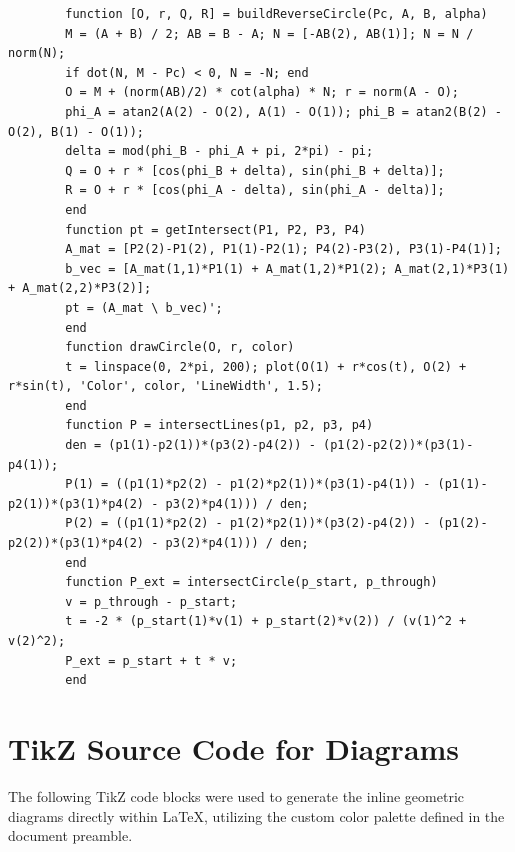 \documentclass{amsart}
\begin{document}
\begin{lstlisting}[caption={Geometric simulation and plotting script}]
		%% Local Functions
		function [O, r, Q, R] = buildReverseCircle(Pc, A, B, alpha)
		M = (A + B) / 2; AB = B - A; N = [-AB(2), AB(1)]; N = N / norm(N);
		if dot(N, M - Pc) < 0, N = -N; end
		O = M + (norm(AB)/2) * cot(alpha) * N; r = norm(A - O);
		phi_A = atan2(A(2) - O(2), A(1) - O(1)); phi_B = atan2(B(2) - O(2), B(1) - O(1));
		delta = mod(phi_B - phi_A + pi, 2*pi) - pi;
		Q = O + r * [cos(phi_B + delta), sin(phi_B + delta)];
		R = O + r * [cos(phi_A - delta), sin(phi_A - delta)];
		end
		function pt = getIntersect(P1, P2, P3, P4)
		A_mat = [P2(2)-P1(2), P1(1)-P2(1); P4(2)-P3(2), P3(1)-P4(1)];
		b_vec = [A_mat(1,1)*P1(1) + A_mat(1,2)*P1(2); A_mat(2,1)*P3(1) + A_mat(2,2)*P3(2)];
		pt = (A_mat \ b_vec)';
		end
		function drawCircle(O, r, color)
		t = linspace(0, 2*pi, 200); plot(O(1) + r*cos(t), O(2) + r*sin(t), 'Color', color, 'LineWidth', 1.5);
		end
		function P = intersectLines(p1, p2, p3, p4)
		den = (p1(1)-p2(1))*(p3(2)-p4(2)) - (p1(2)-p2(2))*(p3(1)-p4(1));
		P(1) = ((p1(1)*p2(2) - p1(2)*p2(1))*(p3(1)-p4(1)) - (p1(1)-p2(1))*(p3(1)*p4(2) - p3(2)*p4(1))) / den;
		P(2) = ((p1(1)*p2(2) - p1(2)*p2(1))*(p3(2)-p4(2)) - (p1(2)-p2(2))*(p3(1)*p4(2) - p3(2)*p4(1))) / den;
		end
		function P_ext = intersectCircle(p_start, p_through)
		v = p_through - p_start;
		t = -2 * (p_start(1)*v(1) + p_start(2)*v(2)) / (v(1)^2 + v(2)^2);
		P_ext = p_start + t * v;
		end
	\end{lstlisting}
	\newpage
	\section{TikZ Source Code for Diagrams}
	The following TikZ code blocks were used to generate the inline geometric diagrams directly within LaTeX, utilizing the custom color palette defined in the document preamble.
	
\end{document}
